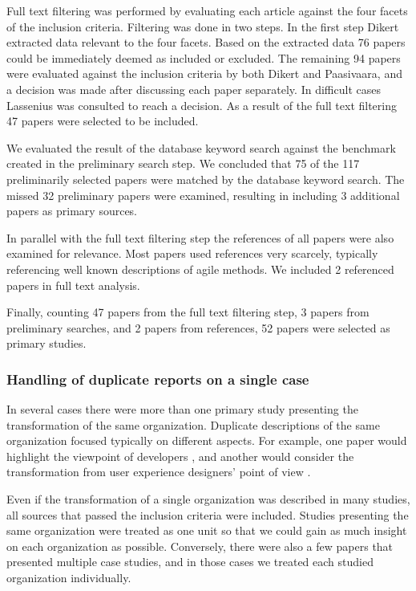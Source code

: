 \documentclass[preprint,authoryear,12pt]{elsarticle}
\begin{document}
Full text filtering was performed by evaluating each article against the four
facets of the inclusion criteria. Filtering was done in two steps. In the first
step Dikert extracted data relevant to the four facets. Based on the extracted
data 76 papers could be immediately deemed as included or excluded. The
remaining 94 papers were evaluated against the inclusion criteria by both Dikert
and Paasivaara, and a decision was made after discussing each paper separately.
In difficult cases Lassenius was consulted to reach a decision. As a result of
the full text filtering 47 papers were selected to be included.

We evaluated the result of the database keyword search against the benchmark
created in the preliminary search step. We concluded that 75 of the 117
preliminarily selected papers were matched by the database keyword search.
The missed 32 preliminary papers were examined, resulting in including 3
additional papers as primary sources.

In parallel with the full text filtering step the references of all papers were
also examined for relevance. Most papers used references very scarcely, typically
referencing well known descriptions of agile methods. We included 2 referenced
papers in full text analysis.

Finally, counting 47 papers from the full text filtering step, 3 papers from
preliminary searches, and 2 papers from references, 52 papers were selected
as primary studies.


\subsubsection{Handling of duplicate reports on a single case}

In several cases there were more than one primary study presenting the
transformation of the same organization. Duplicate descriptions of the same
organization focused typically on different aspects. For example, one paper
would highlight the viewpoint of developers \cite{Fry2007}, and another would
consider the transformation from user experience designers' point of view
\cite{Federoff2009}.

Even if the transformation of a single organization was described in many
studies, all sources that passed the inclusion criteria were included. Studies
presenting the same organization were treated as one unit so that we could gain
as much insight on each organization as possible. Conversely, there were also a
few papers that presented multiple case studies, and in those cases we treated
each studied organization individually.
\end{document}
